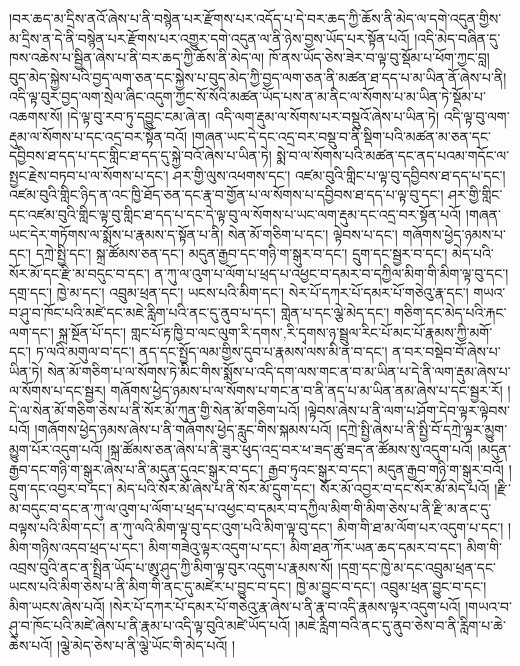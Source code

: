 །བར་ཆད་མ་དྲིས་ནའོ་ཞེས་པ་ནི་བསྙེན་པར་རྫོགས་པར་འདོད་པ་དེ་བར་ཆད་ཀྱི་ཆོས་ནི་མེད་ལ་དགེ་འདུན་གྱིས་མ་དྲིས་ན་དེ་ནི་བསྙེན་པར་རྫོགས་པར་འགྱུར་དགེ་འདུན་ལ་ནི་ཉེས་བྱས་ཡོད་པར་སྟོན་པའོ། །འདི་མེད་བཞིན་དུ་ཁས་འཆེས་པ་སྦྱིན་ཞེས་པ་ནི་བར་ཆད་ཀྱི་ཆོས་ནི་མེད་ལ། ཁོ་ནས་ཡོད་ཅེས་ཟེར་བ་ལྟ་བུ་སྡོམ་པ་ཕོག་ཀྱང་བླ། བུད་མེད་སྐྱེས་པའི་བྱད་ལག་ཅན་དང་སྐྱེས་པ་བུད་མེད་ཀྱི་བྱད་ལག་ཅན་ནི་མཚན་ཐ་དད་པ་མ་ཡིན་ནོ་ཞེས་པ་ནི། འདི་ལྟ་བུར་བྱད་ལག་སྲེལ་ཞིང་འདུག་ཀྱང་སོ་སོའི་མཚན་ཡོད་པས་ན་མ་ནིང་ལ་སོགས་པ་མ་ཡིན་ཏེ་སྡོམ་པ་འཆགས་སོ། །དེ་ལྟ་བུ་རབ་ཏུ་དབྱུང་ངམ་ཞེ་ན། འདི་ལག་རྡུམ་ལ་སོགས་པར་བསྡུའོ་ཞེས་པ་ཡིན་ཏེ། འདི་ལྟ་བུ་ལག་རྡུམ་ལ་སོགས་པ་དང་འདྲ་བར་སྟོན་བའོ། །གཞན་ཡང་དེ་དང་འདྲ་བར་བསྡུ་བ་ནི་སྡིག་པའི་མཚན་མ་ཅན་དང་དབྱིབས་ཐ་དད་པ་དང་གླིང་ཐ་དད་དུ་སྐྱེ་བའོ་ཞེས་པ་ཡིན་ཏེ། སྨེ་བ་ལ་སོགས་པའི་མཚན་དང་ནད་པའམ་གདོང་ལ་སྤྱང་རྗེས་བཏབ་པ་ལ་སོགས་པ་དང་། ཤར་གྱི་ལུས་འཕགས་དང་། འཛམ་བུའི་གླིང་པ་ལྟ་བུ་དབྱིབས་ཐ་དད་པ་དང་། འཛམ་བུའི་གླིང་ཉིད་ན་འང་ཁྱི་ཐོད་ཅན་དང་རྣ་བ་གྱོན་པ་ལ་སོགས་པ་དབྱིབས་ཐ་དད་པ་ལྟ་བུ་དང་། ཤར་གྱི་གླིང་དང་འཛམ་བུའི་གླིང་ལྟ་བུ་གླིང་ཐ་དད་པ་དང་དེ་ལྟ་བུ་ལ་སོགས་པ་ཡང་ལག་རྡུམ་དང་འདྲ་བར་སྟོན་པའོ། །གཞན་ཡང་དེར་གཏོགས་ལ་སྨོས་པ་རྣམས་ད་སྟོན་པ་ནི། སེན་མོ་གཅིག་པ་དང་། ལྟེབས་པ་དང་། གཞོགས་ཕྱེད་ཉམས་པ་དང་། དཀྲེ་སྤྱི་དང་། སྐྲ་ཚོམས་ཅན་དང་། མདུན་རྒྱབ་དང་གཉི་ག་སྒུར་བ་དང་། དྲུག་དང་སྦྱར་བ་དང་། མེད་པའི་སོར་མོ་དང་རྫི་མ་བདུང་བ་དང་། ན་ཀུ་ལ་འུག་པ་ལོག་པ་ཕྲད་པ་འཕྱང་བ་དམར་བ་དཀྱིལ་མིག་གི་མིག་ལྟ་བུ་དང་། དགྲ་དང་། ཁྱེ་མ་དང་། འབྲུམ་ཕྲན་དང་། ཡངས་པའི་མིག་དང་། སེར་པོ་དཀར་པོ་དམར་པོ་གཅེའུ་རྣ་དང་། གཡའ་བ་ཤུ་བ་ཁོང་པའི་མཛེ་དང་མཇེ་རླིག་པའི་ནང་དུ་ནུབ་པ་དང་། གླེན་པ་དང་ལྕེ་མེད་དང་། གཅིག་དང་མེད་པའི་རྐང་ལག་དང་། སྐྲ་སྔོན་པོ་དང་། གླང་པོ་རྟ་ཁྱི་བ་ལང་ལུག་{རི་དགས་,རི་དྭགས་}ཉ་སྦྲུལ་རིང་པོ་མང་པོ་རྣམས་ཀྱི་མགོ་དང་། ཏ་ལའི་མགུལ་བ་དང་། ནད་དང་སྤྱོད་ལམ་གྱིས་དུབ་པ་རྣམས་ལས་མི་ན་བ་དང་། ན་བར་བསྡེབ་བོ་ཞེས་པ་ཡིན་ཏེ། སེན་མོ་གཅིག་པ་ལ་སོགས་ཏེ་མིང་གིས་སྨོས་པ་འདི་དག་ལས་གང་ན་བ་མ་ཡིན་པ་དེ་ནི་ལག་རྡུམ་ཞེས་པ་ལ་སོགས་པ་དང་སྦྱར། གཞོགས་ཕྱེད་ཉམས་པ་ལ་སོགས་པ་གང་ན་བ་ནི་ནད་པ་མ་ཡིན་ནམ་ཞེས་པ་དང་སྦྱར་རོ། །དེ་ལ་སེན་མོ་གཅིག་ཅེས་པ་ནི་སོར་མོ་ཀུན་གྱི་སེན་མོ་གཅིག་པའོ། །ལྟེབས་ཞེས་པ་ནི་ལག་པ་ཤོག་དེབ་ལྟར་ལྟེབས་པའོ། །གཞོགས་ཕྱེད་ཉམས་ཞེས་པ་ནི་གཞོགས་ཕྱེད་རླུང་གིས་སྐམས་པའོ། །དཀྲེ་སྤྱི་ཞེས་པ་ནི་སྤྱི་བོ་དཀྲེ་ལྟར་མྱུག་མྱུག་པོར་འདུག་པའོ། །སྐྲ་ཚོམས་ཅན་ཞེས་པ་ནི་ཟུར་ཕུད་འདྲ་བར་ཕ་ཟད་ཚུ་ཟད་ན་ཚོམས་སུ་འདུག་པའོ། །མདུན་རྒྱབ་དང་གཉི་ག་སྒུར་ཞེས་པ་ནི་མདུན་དུའང་སྒུར་བ་དང་། རྒྱབ་ཏུའང་སྒུར་བ་དང་། མདུན་རྒྱབ་གཉི་ག་སྒུར་བའོ། །དྲུག་དང་འབྱར་བ་དང་། མེད་པའི་སོར་མོ་ཞེས་པ་ནི་སོར་མོ་དྲུག་དང་། སོར་མོ་འབྱར་བ་དང་སོར་མོ་མེད་པའོ། །རྫི་མ་བདུང་བ་དང་ན་ཀུ་ལ་འུག་པ་ལོག་པ་ཕྲད་པ་འཕྱང་བ་དམར་བ་དཀྱིལ་མིག་གི་མིག་ཅེས་པ་ནི་རྫི་མ་ནང་དུ་བལྟས་པའི་མིག་དང་། ན་ཀུ་ལའི་མིག་ལྟ་བུ་དང་འུག་པའི་མིག་ལྟ་བུ་དང་། མིག་གི་ཐ་མ་ལོག་པར་འདུག་པ་དང་། །མིག་གཉིས་འདབ་ཕྲད་པ་དང་། མིག་གཟེའུ་ལྟར་འདུག་པ་དང་། མིག་ཐན་ཀོར་ཡན་ཆད་དམར་བ་དང་། མིག་གི་འབྲས་བུའི་ནང་ན་སྤྲིན་ཡོད་པ་ཨུ་ཤུད་ཀྱི་མིག་ལྟ་བུར་འདུག་པ་རྣམས་སོ། །དགྲ་དང་ཁྱེ་མ་དང་འབྲུམ་ཕྲན་དང་ཡངས་པའི་མིག་ཅེས་པ་ནི་མིག་གི་ནང་དུ་མཛེར་པ་བྱུང་བ་དང་། ཁྱེ་མ་བྱུང་བ་དང་། འབྲུམ་ཕྲན་བྱུང་བ་དང་། མིག་ཡངས་ཞེས་པའོ། །སེར་པོ་དཀར་པོ་དམར་པོ་གཅེའུ་རྣ་ཞེས་པ་ནི་རྣ་བ་འདི་རྣམས་ལྟར་འདུག་པའོ། །གཡའ་བ་ཤུ་བ་ཁོང་པའི་མཛེ་ཞེས་པ་ནི་རྣམ་པ་འདི་ལྟ་བུའི་མཛེ་ཡོད་པའོ། །མཇེ་རླིག་བའི་ནང་དུ་ནུབ་ཅེས་བ་ནི་རླིག་པ་ཆེ་ཆེས་པའོ། །ལྕེ་མེད་ཅེས་པ་ནི་ལྕེ་ཡོང་གི་མེད་པའོ། །
